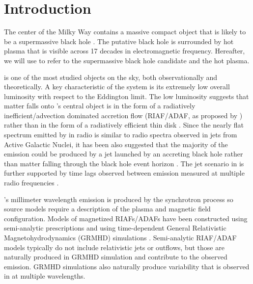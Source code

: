 \section{Introduction}
\label{sec:intro}

The center of the Milky Way contains a massive compact object that is likely to be a supermassive black hole \citep{2019Sci...365..664D, 2019A&A...625L..10G}.
The putative black hole is surrounded by hot plasma that is visible across 17 decades in electromagnetic frequency.
Hereafter, we will use \sgra to refer to the supermassive black hole candidate and the hot plasma.

\sgra is one of the most studied objects on the sky, both observationally and theoretically.  A key  characteristic of the \sgra system is its extremely low overall luminosity with respect to the Eddington limit.
The low luminosity suggests that matter falls onto \sgra's central object is in the form of a radiatively inefficient/advection dominated accretion flow (RIAF/ADAF, as proposed by \citealt{1977ApJ...214..840I,1994ApJ...428L..13N, 1995ApJ...444..231N, 1995ApJ...452..710N, 1996A&AS..120C.287N, 1998ApJ...492..554N,2014ARA&A..52..529Y}) rather than in the form of a radiatively efficient thin disk \citep{1973A&A....24..337S}.
Since the nearly flat spectrum emitted by \sgra in radio is similar to radio spectra observed in jets from Active Galactic Nuclei, it has been also suggested that the majority of the \sgra emission could be produced by a jet launched by an accreting black hole rather than matter falling through the black hole event horizon \citep{1993A&A...278L...1F, 2000A&A...362..113F}.
The jet scenario in \sgra is further supported by time lags observed between emission measured at multiple radio frequencies \citep{2021arXiv210713402B}.

\sgra's millimeter wavelength emission is produced by the  synchrotron process so source models require a description of the plasma and magnetic field configuration.  Models of magnetized RIAFs/ADAFs have been constructed using semi-analytic prescriptions \citep[e.g.,][]{1995Natur.374..623N,2000ApJ...541..234O, 2009ApJ...697...45B,2011ApJ...735..110B} and using time-dependent General Relativistic Magnetohydrodynamics (GRMHD) simulations \citep[e.g.,][]{2000ApJ...528..462H, 2003ApJ...589..458D, 2003ApJ...589..444G, 2007CQGra..24S.235G, 2012ApJS..201....9F, 2014ApJ...796...22F, 2016ApJS..225...22W, 2017ApJS..231...17A, 2018JPhCS1031a2008O, Olivares2019, 2019ApJS..243...26P}.
Semi-analytic RIAF/ADAF models typically do not include relativistic jets or outflows, but those are naturally produced in GRMHD simulation and contribute to the observed emission. GRMHD simulations also naturally produce variability that is observed in \sgra at multiple wavelengths.

